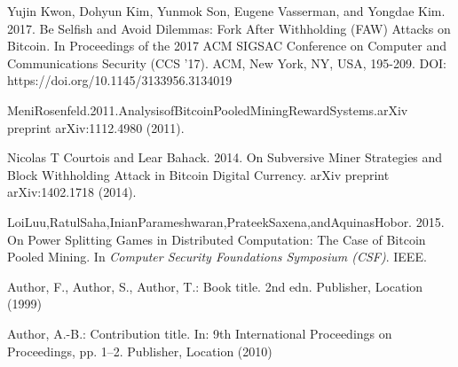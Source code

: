 \documentclass[a4paper, 11pt]{article}
\begin{document}
\begin{CJK*}{UTF8}{gbsn}
\begin{thebibliography}{8}
    Yujin Kwon, Dohyun Kim, Yunmok Son, Eugene Vasserman, and Yongdae Kim. 2017. 
    Be Selfish and Avoid Dilemmas: Fork After Withholding (FAW) Attacks on Bitcoin. 
    In Proceedings of the 2017 ACM SIGSAC Conference on Computer and Communications Security (CCS '17). 
    ACM, New York, NY, USA, 195-209. DOI: https://doi.org/10.1145/3133956.3134019

    MeniRosenfeld.2011.AnalysisofBitcoinPooledMiningRewardSystems.arXiv
    preprint arXiv:1112.4980 (2011).

    Nicolas T Courtois and Lear Bahack. 2014. 
    On Subversive Miner Strategies and Block Withholding Attack in Bitcoin Digital Currency. 
    arXiv preprint arXiv:1402.1718 (2014).

    LoiLuu,RatulSaha,InianParameshwaran,PrateekSaxena,andAquinasHobor. 2015. 
    On Power Splitting Games in Distributed Computation: The Case of Bitcoin Pooled Mining. 
    In \textit{Computer Security Foundations Symposium (CSF)}. IEEE.

    Author, F., Author, S., Author, T.: Book title. 2nd edn. Publisher,
    Location (1999)
    
    Author, A.-B.: Contribution title. In: 9th International Proceedings
    on Proceedings, pp. 1--2. Publisher, Location (2010)

    
    
    \end{thebibliography}
    
    \end{CJK*}
    
    
\end{document}
